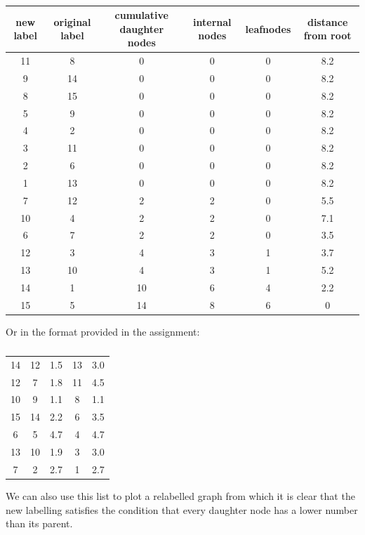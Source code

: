 \documentclass{article}
\begin{document}
\begin{table}[h]
\centering
\begin{tabular}{ |c|c|c|c|c|c|}
\hline
 new label & original label & cumulative daughter nodes & internal nodes & leafnodes & distance from root \\
\hline
11 & 8 & 0 & 0 & 0 & 8.2 \\
9 & 14 & 0 & 0 & 0 & 8.2 \\
8 & 15 & 0 & 0 & 0 & 8.2 \\
5 & 9 & 0 & 0 & 0 & 8.2 \\
4 & 2 & 0 & 0 & 0 & 8.2 \\
3 & 11 & 0 & 0 & 0 & 8.2 \\
2 & 6 & 0 & 0 & 0 & 8.2 \\
1 & 13 & 0 & 0 & 0 & 8.2 \\
\hline
7 & 12 & 2 & 2 & 0 & 5.5 \\
10 & 4 & 2 & 2 & 0 & 7.1 \\
6 & 7 & 2 & 2 & 0 & 3.5 \\
12 & 3 & 4 & 3 & 1 & 3.7 \\
13 & 10 & 4 & 3 & 1 & 5.2 \\
14 & 1 & 10 & 6 & 4 & 2.2 \\
15 & 5 & 14 & 8 & 6 & 0 \\
\hline
\end{tabular}
\caption{}
\label{tab:treesum2}
\end{table}

Or in the format provided in the assignment:

\begin{table}[h]
\centering
\begin{tabular}{ |c c c c c|}
\hline
14  &  12 &   1.5 &  13  &  3.0 \\  
12  &  7   &  1.8  & 11  &  4.5  \\
10  &  9   &  1.1  & 8   &  1.1  \\
15  &  14  &  2.2  & 6   &  3.5  \\
6   &  5  &   4.7 &  4   &  4.7  \\
13  &  10  &  1.9  & 3   &  3.0  \\
7   &  2   &  2.7 &  1  &   2.7 \\
\hline
\end{tabular}
\caption{}
\label{tab:treesum3}
\end{table}

\newpage


We can also use this list to plot a relabelled graph from which it is clear that the new labelling satisfies the condition that every daughter node has a lower number than its parent.
\end{document}
